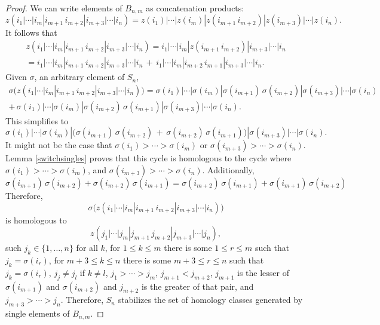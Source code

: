 \documentclass[12py]{amsart}%
\theoremstyle{definition}\newtheorem{definition}[thm]{Definition}
\theoremstyle{definition}
\begin{document}
\begin{proof}
We can write elements of $B_{n,m}$ as concatenation products:
\[
z(i_{1}|\cdots|i_{m}|i_{m+1}\,i_{m+2}|i_{m+3}|\cdots|i_{n})=z(i_{1})|\cdots|z(i_{m})|z(i_{m+1}\,i_{m+2})|z(i_{m+3})|\cdots|z(i_{n}).
\]
It follows that 
\begin{align*}
z(i_{1}|\cdots|i_{m}|i_{m+1}\,i_{m+2}|i_{m+3}|\cdots|i_{n})
=i_{1}|\cdots|i_{m}|z(i_{m+1}\,i_{m+2})|i_{m+3}|\cdots|i_{n}\\
=i_{1}|\cdots|i_{m}|i_{m+1}\,i_{m+2}|i_{m+3}|\cdots|i_{n}\,+\,i_{1}|\cdots|i_{m}|i_{m+2}\,i_{m+1}|i_{m+3}|\cdots|i_{n}.
\end{align*}
Given $\sigma$, an arbitrary element of $S_{n}$,
\begin{multline*}
\sigma\big(z(i_{1}|\cdots|i_{m}|i_{m+1}\,i_{m+2}|i_{m+3}|\cdots|i_{n})\big)
=\sigma(i_{1})|\cdots|\sigma(i_{m})|\sigma(i_{m+1})\,\sigma(i_{m+2})|\sigma(i_{m+3})|\cdots|\sigma(i_{n})\,\\+\,\sigma(i_{1})|\cdots|\sigma(i_{m})|\sigma(i_{m+2})\,\sigma(i_{m+1})|\sigma(i_{m+3})|\cdots|\sigma(i_{n}).
\end{multline*}
This simplifies to
\[
\sigma(i_{1})|\cdots|\sigma(i_{m})|\big(\sigma(i_{m+1})\,\sigma(i_{m+2})\,+\,\sigma(i_{m+2})\,\sigma(i_{m+1})\big)|\sigma(i_{m+3})|\cdots|\sigma(i_{n}).
\]
It might not be the case that $\sigma(i_{1})>\cdots>\sigma(i_{m})$ or $\sigma(i_{m+3})>\cdots>\sigma(i_{n})$. Lemma \ref{switchsingles} proves that this cycle is homologous to the cycle where $\sigma(i_{1})>\cdots>\sigma(i_{m})$, and $\sigma(i_{m+3})>\cdots>\sigma(i_{n})$. Additionally,
\[
\sigma(i_{m+1})\,\sigma(i_{m+2})+\sigma(i_{m+2})\,\sigma(i_{m+1})=\sigma(i_{m+2})\,\sigma(i_{m+1})+\sigma(i_{m+1})\,\sigma(i_{m+2})
\]
Therefore,
\[
\sigma\big(z(i_{1}|\cdots|i_{m}|i_{m+1}\,i_{m+2}|i_{m+3}|\cdots|i_{n})\big)
\]
is homologous to 
\[
z(j_{1}|\cdots|j_{m}|j_{m+1}\,j_{m+2}|j_{m+3}|\cdots|j_{n}),
\]
such $j_{k}\in\{1,\dots, n\}$ for all $k$, for $1\le k\le m$ there is some $1\le r\le m$ such that $j_{k}=\sigma(i_{r})$, for $m+3\le k\le n$ there is some $m+3\le r\le n$ such that $j_{k}=\sigma(i_{r})$, $j_{j}\neq j_{l}$ if $k\neq l$, $j_{1}>\cdots>j_{m}$, $j_{m+1}<j_{m+2}$, $j_{m+1}$ is the lesser of $\sigma(i_{m+1})$ and $\sigma(i_{m+2})$ and $j_{m+2}$ is the greater of that pair, and $j_{m+3}>\cdots>j_{n}$. Therefore, $S_{n}$ stabilizes the set of homology classes generated by single elements of $B_{n,m}$.


\end{proof}
\end{document}
